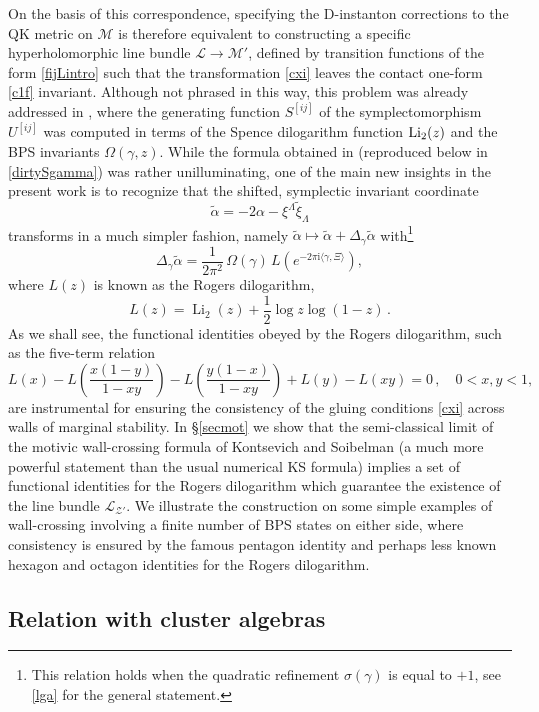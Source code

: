 \documentclass[12pt,reqno]{article}
\numberwithin{equation}{section}
\DeclareMathOperator{\Li}{Li}
\newcommand{\be}{\begin{equation}}
\newcommand{\ee}{\end{equation}}
\newcommand{\I}{\mathrm{i}}
\newcommand{\cM}{\mathcal{M}}
\newcommand{\cZ}{\mathcal{Z}}
\newcommand{\lb}{\mathscr{L}}
\def\talp{\tilde\alpha}
\def\ui#1{^{[#1]}}
\newcommand{\txi}{\tilde\xi}
\def\pcM{\cM'}
\def\pcZ{\cZ'}
\numberwithin{equation}{section}
\begin{document}
On the basis of this correspondence, specifying  the D-instanton corrections to the QK metric
on $\cM$ is therefore equivalent to constructing
a specific hyperholomorphic line bundle $\lb\rightarrow\pcM$, defined by
transition functions of the form \eqref{fijLintro} such that the transformation \eqref{cxi}
leaves the contact one-form \eqref{c1f} invariant. Although not phrased in this way,
this problem was already addressed in \cite{Alexandrov:2008gh,Alexandrov:2009zh}, where
the generating function $S\ui{ij}$  of the symplectomorphism $U\ui{ij}$ was computed
in terms of the Spence dilogarithm function ${\rm Li}_2(z)$ and the BPS invariants
$\Omega(\gamma,z)$. While the formula obtained in \cite{Alexandrov:2009zh}
(reproduced below in \eqref{dirtySgamma}) was rather unilluminating,
one of the main new insights in the present work is to recognize that the
shifted, symplectic invariant coordinate
\be
\talp=-2\alpha-\xi^\Lambda\txi_\Lambda
\label{deftalp}
\ee
transforms in a much simpler fashion, namely $\talp\mapsto\talp + \Delta_\gamma\talp $
with\footnote{This relation holds when the quadratic refinement $\sigma(\gamma)$
is equal to $+1$, see \eqref{lga} for the general statement.}
\be
\label{lgaintro}
\Delta_\gamma\talp = \frac{1}{2\pi^2} \, \Omega(\gamma) \,
L\left(e^{-2\pi\I\langle\gamma,\Xi\rangle}\right),
\ee
where $L(z)$ is  known as the Rogers dilogarithm,
\be
\label{defrogers}
L(z) = \Li_2(z)+\frac12 \log z \log(1-z)\, .
\ee
As we shall see, the functional identities obeyed by the  Rogers dilogarithm, such as the five-term relation
\be
\label{Lreal5term2intro}
L(x) -L\left(\frac{x(1-y)}{1-xy}\right)- L\left(\frac{y(1-x)}{1-xy}\right) + L(y) - L(xy)=0\, ,
\quad 0<x,y<1 ,
\ee
are instrumental for ensuring
the consistency of the gluing conditions \eqref{cxi} across walls of marginal stability.
In \S \ref{secmot} we show that the semi-classical limit of
the motivic wall-crossing formula of Kontsevich and Soibelman \cite{ks}
(a much more powerful statement than the usual numerical
KS formula) implies a set of functional identities for the Rogers dilogarithm which
guarantee the existence of the line bundle $\lb_{\pcZ}$. We illustrate the construction
on some simple examples of wall-crossing involving a finite number of BPS states
on either side, where consistency is ensured by the famous pentagon identity
and perhaps less known hexagon and octagon identities for the Rogers dilogarithm.

\subsection*{Relation with cluster algebras}
\end{document}
